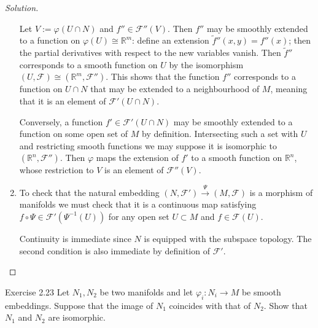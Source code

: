 \begin{proof}[Solution]
\begin{enumerate}[label=(\alph*)]
	Let \(V:=\varphi(U \cap N)\) and \(f'' \in \mathcal{F}''(V)\). Then $f''$ may be smoothly extended to a function on \(\varphi(U)\cong \mathbb{R}^m\): define an extension \(\tilde{f}''(x,y)=f''(x)\); then the partial derivatives with respect to the new variables vanish. Then \(\tilde{f}''\) corresponds to a smooth function on \(U\) by the isomorphism  \((U,\mathcal{F})\cong (\mathbb{R}^m,\mathcal{F}'')\). This shows that the function $f''$ corresponds to a function on \(U \cap N\) that may be extended to a neighbourhood of  \(M\), meaning that it is an element of \(\mathcal{F}'(U \cap N)\).

	Conversely, a function \(f' \in \mathcal{F}'(U\cap N)\) may be smoothly extended to a function on some open set of \(M\) by definition. Intersecting such a set with \(U\) and restricting smooth functions we may suppose it is isomorphic to \((\mathbb{R}^n, \mathcal{F}'')\). Then \(\varphi\) maps the extension of \(f'\) to a smooth function on \(\mathbb{R}^n\), whose restriction to \(V\) is an element of \(\mathcal{F}''(V)\).

\item To check that the natural embedding \((N,\mathcal{F}') \xrightarrow{\Psi} (M, \mathcal{F})\) is a morphism of manifolds we must check that it is a continuous map satisfying \(f \circ\Psi \in \mathcal{F}'(\Psi^{-1}(U))\) for any open set \(U \subset M\) and \(f \in \mathcal{F}(U)\).

	Continuity is immediate since {\color{2}$N$ is equipped with the subspace topology}. The second condition is also immediate by definition of \(\mathcal{F}'\).
\end{enumerate}
\end{proof}



\begin{thing4}{Exercise 2.23}\label{exer:2.23}\leavevmode
Let \(N_1,N_2\) be two manifolds and let \(\varphi_i:N_i\to M\) be smooth embeddings. Suppose that the image of \(N_1\) coincides with that of \(N_2\). Show that \(N_1\) and \(N_2\) are isomorphic.
\end{thing4}

